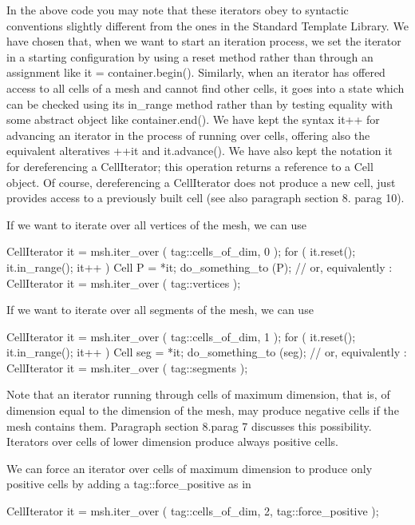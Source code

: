In the above code you may note that these iterators obey to syntactic conventions
slightly different from the ones in the Standard Template Library.
We have chosen that, when we want to start an iteration process, we set the iterator in
a starting configuration by using a {\codett reset} method rather than through an assignment
like {\codett it = container.begin()}.
Similarly, when an iterator has offered access to all cells of a mesh and cannot find
other cells, it goes into a state which can be checked using its {\codett in\_range} method
rather than by testing equality with some abstract object like {\codett container.end()}.
We have kept the syntax {\codett it++} for advancing an iterator in the process of
running over cells, offering also the equivalent alteratives {\codett ++it} and
{\codett it.advance()}.
We have also kept the notation {\codett *it} for dereferencing a {\codett CellIterator};
this operation returns a reference to a {\codett Cell} object.
Of course, dereferencing a {\codett CellIterator} does not produce a new cell,
just provides access to a previously built cell (see also paragraph \numb section 8.\numb
parag 10).

If we want to iterate over all vertices of the mesh, we can use

\verbatim
   CellIterator it = msh.iter_over ( tag::cells_of_dim, 0 );
   for ( it.reset(); it.in_range(); it++ )
   {  Cell P = *it;  do_something_to (P);  }
   // or, equivalently :
   CellIterator it = msh.iter_over ( tag::vertices );
\endverbatim

If we want to iterate over all segments of the mesh, we can use

\verbatim
   CellIterator it = msh.iter_over ( tag::cells_of_dim, 1 );
   for ( it.reset(); it.in_range(); it++ )
   {  Cell seg = *it;  do_something_to (seg);  }
   // or, equivalently :
   CellIterator it = msh.iter_over ( tag::segments );
\endverbatim

Note that an iterator running through cells of maximum dimension, that is, of dimension equal
to the dimension of the mesh, may produce negative cells if the mesh contains them.
Paragraph \numb section 8.\numb parag 7 discusses this possibility.
Iterators over cells of lower dimension produce always positive cells.

We can force an iterator over cells of maximum dimension to produce only positive cells
by adding a {\codett tag::force\_positive} as in

\verbatim
   CellIterator it = msh.iter_over ( tag::cells_of_dim, 2, tag::force_positive );
\endverbatim

